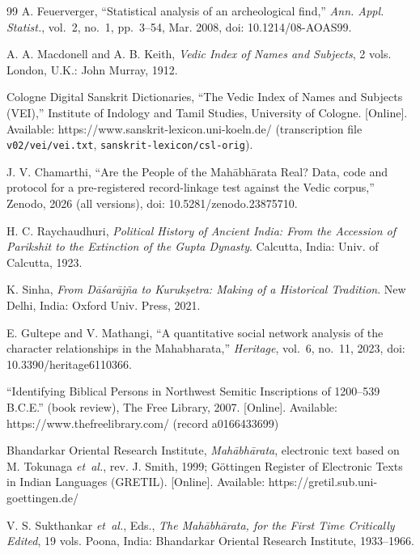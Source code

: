 \documentclass[journal]{IEEEtran}
\begin{document}
\begin{thebibliography}{99}
A. Feuerverger, ``Statistical analysis of an archeological find,'' \textit{Ann. Appl. Statist.}, vol.~2, no.~1,
pp.~3--54, Mar. 2008, doi: 10.1214/08-AOAS99.

A. A. Macdonell and A. B. Keith, \textit{Vedic Index of Names and Subjects}, 2 vols. London, U.K.: John Murray, 1912.

Cologne Digital Sanskrit Dictionaries, ``The Vedic Index of Names and Subjects (VEI),'' Institute of Indology and
Tamil Studies, University of Cologne. [Online]. Available: https://www.sanskrit-lexicon.uni-koeln.de/
(transcription file \texttt{v02/vei/vei.txt}, \texttt{sanskrit-lexicon/csl-orig}).

J. V. Chamarthi, ``Are the People of the Mahābhārata Real? Data, code and protocol for a pre-registered record-linkage
test against the Vedic corpus,'' Zenodo, 2026 (all versions), doi: 10.5281/zenodo.23875710.

H. C. Raychaudhuri, \textit{Political History of Ancient India: From the Accession of Parikshit to the Extinction of the
Gupta Dynasty}. Calcutta, India: Univ. of Calcutta, 1923.

K. Sinha, \textit{From Dāśarājña to Kurukṣetra: Making of a Historical Tradition}. New Delhi, India: Oxford Univ.
Press, 2021.

E. Gultepe and V. Mathangi, ``A quantitative social network analysis of the character relationships in the
Mahabharata,'' \textit{Heritage}, vol.~6, no.~11, 2023, doi: 10.3390/heritage6110366.

``Identifying Biblical Persons in Northwest Semitic Inscriptions of 1200--539 B.C.E.'' (book review), The Free Library,
2007. [Online]. Available: https://www.thefreelibrary.com/ (record a0166433699)

Bhandarkar Oriental Research Institute, \textit{Mahābhārata}, electronic text based on M. Tokunaga \textit{et~al.}, rev.
J. Smith, 1999; Göttingen Register of Electronic Texts in Indian Languages (GRETIL). [Online]. Available:
https://gretil.sub.uni-goettingen.de/

V. S. Sukthankar \textit{et~al.}, Eds., \textit{The Mahābhārata, for the First Time Critically Edited}, 19 vols.
Poona, India: Bhandarkar Oriental Research Institute, 1933--1966.

\end{thebibliography}
\end{document}
